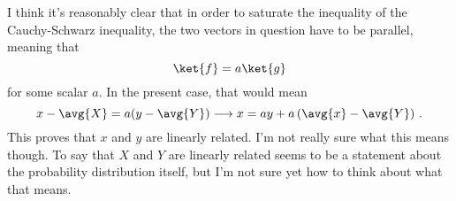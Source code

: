 I think it's reasonably clear that in order to saturate the inequality of the Cauchy-Schwarz inequality, the two vectors in question have to be parallel, meaning that
\begin{equation*}
\ket{f} = a \ket{g}
\end{equation*}
for some scalar $a$.
In the present case, that would mean
\begin{equation*}
x - \avg{X} = a (y - \avg{Y}) \longrightarrow x = ay + a \left( \avg{x} - \avg{Y} \right) \, .
\end{equation*}
This proves that $x$ and $y$ are linearly related.
I'm not really sure what this means though.
To say that $X$ and $Y$ are linearly related seems to be a statement about the probability distribution itself, but I'm not sure yet how to think about what that means.
